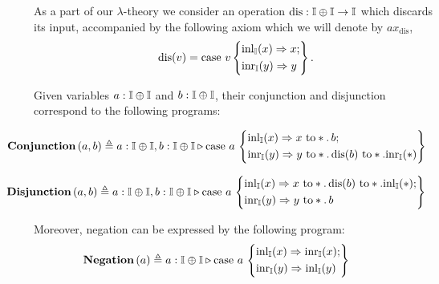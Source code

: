 As a part of our $\lambda$-theory we consider an operation $\text{dis}: \mathbb{I} \oplus \mathbb{I} \to \mathbb{I}$ which discards its input, accompanied by the following axiom which we will denote by $ax_\text{dis}$,
\[\text{dis}(v) = \text{case } v \left\{
    \begin{aligned} 
    &\mathrm{inl}_{\mathbb{I}}(x) \Rightarrow x ; \\
    &\mathrm{inr}_{\mathbb{I}}(y) \Rightarrow  y  \\ 
  \end{aligned}  
  \right\} . \]

Given variables $a : \mathbb{I} \oplus \mathbb{I}$ and $b : \mathbb{I} \oplus \mathbb{I}$, their conjunction and disjunction correspond to the following programs:

\begin{align*}
  & \hspace{-25pt}\textbf{Conjunction}\,(a,b) \triangleq a:\typeI \oplus \typeI, b:\typeI \oplus \typeI \vljud \text{case } a\,
\left\{
    \begin{aligned} 
    &\inl_{\typeI}(x) \Rightarrow x \text{ to} *. \, b ; \\
    &\inr_{\typeI}(y) \Rightarrow y  \text{ to} *. \,  \text{dis}(b) \text{ to} *. \inr_{\typeI}(*)  \\ 
  \end{aligned}  
  \right\}
\end{align*}

\begin{align*}
  & \hspace{-25pt}\textbf{Disjunction}\,(a,b) \triangleq a:\typeI \oplus \typeI, b:\typeI \oplus \typeI \vljud \text{case } a\,
\left\{
    \begin{aligned} 
    &\inl_{\typeI}(x) \Rightarrow  x\text{ to} *. \,  \text{dis}(b) \text{ to} *. \inl_{\typeI}(*) ; \\
    &\inr_{\typeI}(y) \Rightarrow  y \text{ to} *. \,  b  \\ 
  \end{aligned}  
  \right\}
\end{align*}

Moreover, negation can be expressed by the following program:
  \begin{align*}
  & \hspace{-25pt}\textbf{Negation}\,(a) \triangleq a:\typeI \oplus \typeI \vljud \text{case } a\,
\left\{
    \begin{aligned} 
    &\inl_{\typeI}(x) \Rightarrow \inr_{\typeI}(x) ; \\
    &\inr_{\typeI}(y) \Rightarrow  \inl_{\typeI}(y)  \\ 
  \end{aligned}  
  \right\}
\end{align*}

